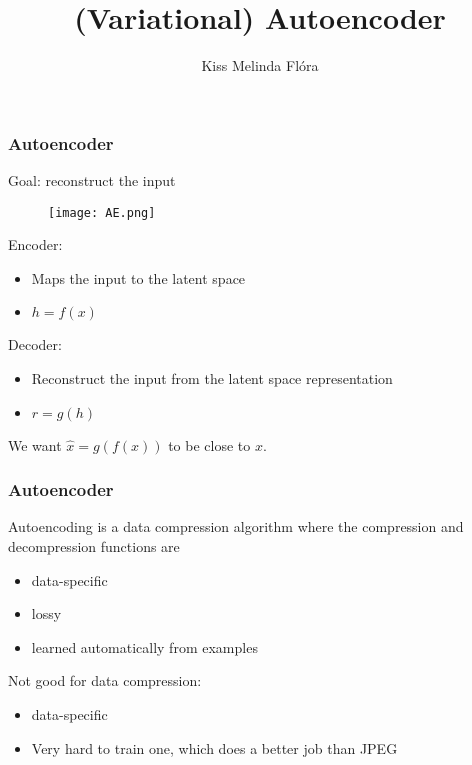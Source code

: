 \documentclass[t]{beamer}
\title{\textbf{(Variational) Autoencoder}}
\subtitle{}
\author{Kiss Melinda Flóra}
\date{}
\begin{document}
\begin{frame}
  \titlepage
\end{frame}


\begin{frame}
  \frametitle{Autoencoder}

  Goal: reconstruct the input

  \begin{figure}
    \texttt{[image: AE.png]}
  \end{figure}

  Encoder:
  
  \begin{itemize}
  \item Maps the input to the latent space
  \item $h = f(x)$ 
  \end{itemize}

  Decoder:

  \begin{itemize}
  \item Reconstruct the input from the latent space
    representation
  \item $r = g(h)$
  \end{itemize}

  We want $\hat{x} = g(f(x))$ to be close to $x$.
\end{frame}

\begin{frame}
  \frametitle{Autoencoder}
  
  Autoencoding is a data compression algorithm where the
  compression and decompression functions are

  \begin{itemize}
  \item data-specific
  \item lossy 
  \item learned automatically from examples
  \end{itemize}

  \vspace{15pt}

  Not good for data compression:

  \begin{itemize}
  \item data-specific
  \item Very hard to train one, which does a better job than
    JPEG
  \end{itemize}

\end{frame}
\end{document}
